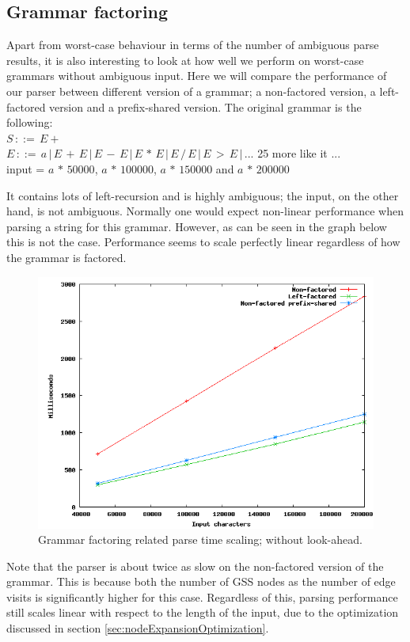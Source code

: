 \documentclass[a4paper,10pt]{article}
\begin{document}
\subsection{Grammar factoring}

Apart from worst-case behaviour in terms of the number of ambiguous parse results, it is also interesting to look at how well we perform on worst-case grammars without ambiguous input. Here we will compare the performance of our parser between different version of a grammar; a non-factored version, a left-factored version and a prefix-shared version. The original grammar is the following:\\
$S\,::=\,E+$\\
$E\,::=\,a\,|\,E\,+\,E\,|\,E\,-\,E\,|\,E\,*\,E\,|\,E\,/\,E\,|\,E\,>\,E\,|\,...$ 25 more like it ...\\
input = $a\,*\,50000$, $a\,*\,100000$, $a\,*\,150000$ and $a\,*\,200000$

It contains lots of left-recursion and is highly ambiguous; the input, on the other hand, is not ambiguous. Normally one would expect non-linear performance when parsing a string for this grammar. However, as can be seen in the graph below this is not the case. Performance seems to scale perfectly linear regardless of how the grammar is factored.

\begin{figure}[H]
\centering
\includegraphics[scale=0.5]{grammar-factoring.png}
\caption{Grammar factoring related parse time scaling; without look-ahead.}
\end{figure}

Note that the parser is about twice as slow on the non-factored version of the grammar. This is because both the number of GSS nodes as the number of edge visits is significantly higher for this case. Regardless of this, parsing performance still scales linear with respect to the length of the input, due to the optimization discussed in section \ref{sec:nodeExpansionOptimization}.
\end{document}
